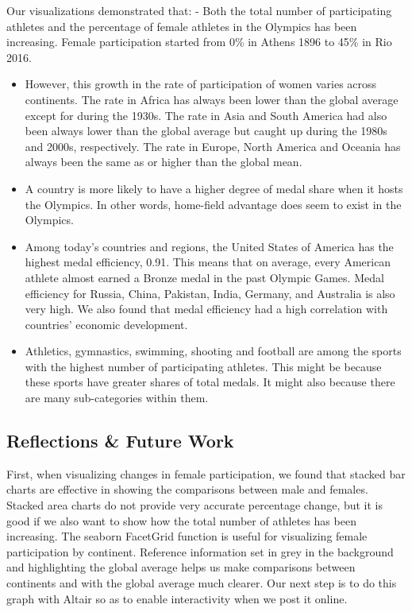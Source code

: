 \documentclass[
]{article}
\begin{document}
Our visualizations demonstrated that:
- Both the total number of participating athletes and the percentage of female athletes in the Olympics has been increasing. Female participation started from 0\% in Athens 1896 to 45\% in Rio 2016.

\begin{itemize}
\item
  However, this growth in the rate of participation of women varies across continents. The rate in Africa has always been lower than the global average except for during the 1930s. The rate in Asia and South America had also been always lower than the global average but caught up during the 1980s and 2000s, respectively. The rate in Europe, North America and Oceania has always been the same as or higher than the global mean.
\item
  A country is more likely to have a higher degree of medal share when it hosts the Olympics. In other words, home-field advantage does seem to exist in the Olympics.
\item
  Among today's countries and regions, the United States of America has the highest medal efficiency, 0.91. This means that on average, every American athlete almost earned a Bronze medal in the past Olympic Games. Medal efficiency for Russia, China, Pakistan, India, Germany, and Australia is also very high. We also found that medal efficiency had a high correlation with countries' economic development.
\item
  Athletics, gymnastics, swimming, shooting and football are among the sports with the highest number of participating athletes. This might be because these sports have greater shares of total medals. It might also because there are many sub-categories within them.
\end{itemize}

\hypertarget{conclusion-reflections}{%
\subsection{Reflections \& Future Work}\label{conclusion-reflections}}

First, when visualizing changes in female participation, we found that stacked bar charts are effective in showing the comparisons between male and females. Stacked area charts do not provide very accurate percentage change, but it is good if we also want to show how the total number of athletes has been increasing. The seaborn FacetGrid function is useful for visualizing female participation by continent. Reference information set in grey in the background and highlighting the global average helps us make comparisons between continents and with the global average much clearer. Our next step is to do this graph with Altair so as to enable interactivity when we post it online.
\end{document}

